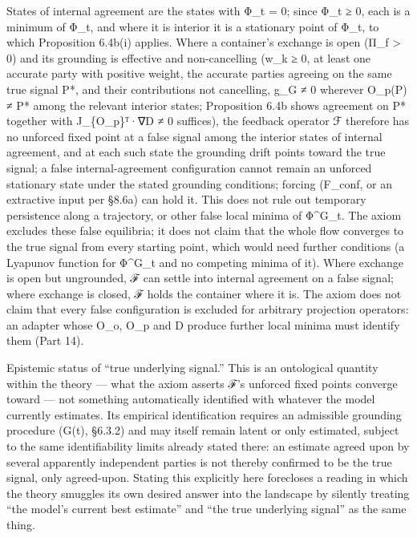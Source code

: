 \documentclass[
]{article}
\begin{document}
States of internal agreement are the states with Φ\_t = 0; since Φ\_t ≥
0, each is a minimum of Φ\_t, and where it is interior it is a
stationary point of Φ\_t, to which Proposition 6.4b(i) applies. Where a
container's exchange is open (Π\_f \textgreater{} 0) and its grounding
is effective and non-cancelling (w\_k ≥ 0, at least one accurate party
with positive weight, the accurate parties agreeing on the same true
signal P*, and their contributions not cancelling, g\_G ≠ 0 wherever
O\_p(P) ≠ P* among the relevant interior states; Proposition 6.4b shows
agreement on P* together with J\_\{O\_p\}ᵀ·∇D ≠ 0 suffices), the
feedback operator ℱ therefore has no unforced fixed point at a false
signal among the interior states of internal agreement, and at each such
state the grounding drift points toward the true signal; a false
internal-agreement configuration cannot remain an unforced stationary
state under the stated grounding conditions; forcing (F\_conf, or an
extractive input per §8.6a) can hold it. This does not rule out
temporary persistence along a trajectory, or other false local minima of
Φ\^{}G\_t. The axiom excludes these false equilibria; it does not claim
that the whole flow converges to the true signal from every starting
point, which would need further conditions (a Lyapunov function for
Φ\^{}G\_t and no competing minima of it). Where exchange is open but
ungrounded, ℱ can settle into internal agreement on a false signal;
where exchange is closed, ℱ holds the container where it is. The axiom
does not claim that every false configuration is excluded for arbitrary
projection operators: an adapter whose O\_o, O\_p and D produce further
local minima must identify them (Part 14).

Epistemic status of ``true underlying signal.'' This is an ontological
quantity within the theory --- what the axiom asserts ℱ's unforced fixed
points converge toward --- not something automatically identified with
whatever the model currently estimates. Its empirical identification
requires an admissible grounding procedure (G(t), §6.3.2) and may itself
remain latent or only estimated, subject to the same identifiability
limits already stated there: an estimate agreed upon by several
apparently independent parties is not thereby confirmed to be the true
signal, only agreed-upon. Stating this explicitly here forecloses a
reading in which the theory smuggles its own desired answer into the
landscape by silently treating ``the model's current best estimate'' and
``the true underlying signal'' as the same thing.
\end{document}
